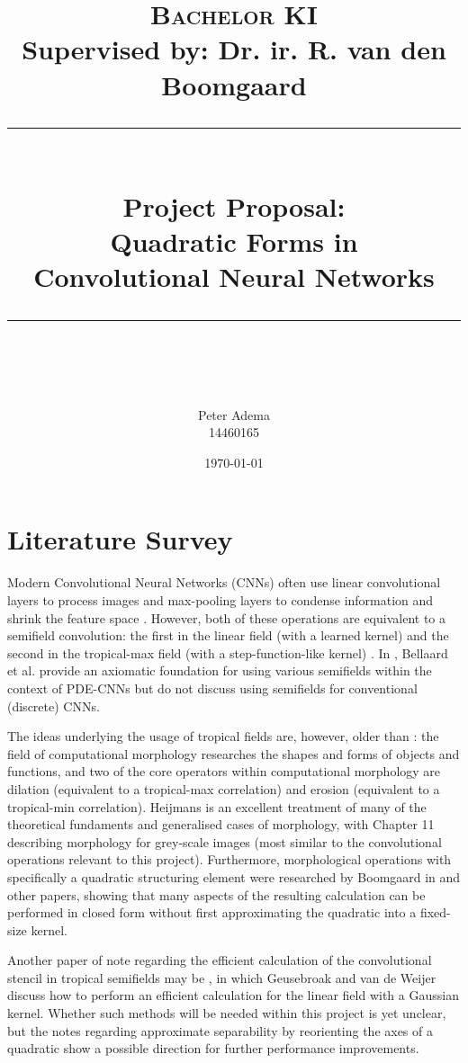 \documentclass[11pt]{article} %
\title{	
    \vspace*{-1.5cm}
	\normalfont\normalsize
	\textsc{Bachelor KI}\\ Supervised by: Dr. ir. R. van den Boomgaard\\ %
	\vspace{3pt}
	\rule{\linewidth}{0.5pt}\\
	{\huge Project Proposal:\\Quadratic Forms in\\ Convolutional Neural Networks}\\ %
	\vspace{4pt}
	\rule{\linewidth}{2pt}\\
	\vspace{4pt}
}
\author{
    \Large Peter Adema \\ 14460165
}
\date{\normalsize\today}  %
\begin{document}
\maketitle %

\section{Literature Survey}
Modern Convolutional Neural Networks (CNNs) often use linear convolutional layers to process images and max-pooling layers to condense information and shrink the feature space \cite{introconvnets}. However, both of these operations are equivalent to a semifield convolution: the first in the linear field (with a learned kernel) and the second in the tropical-max field (with a step-function-like kernel) \cite{bellaardaxiomatic}. In \cite{bellaardaxiomatic}, Bellaard et al. provide an axiomatic foundation for using various semifields within the context of PDE-CNNs but do not discuss using semifields for conventional (discrete) CNNs. 

The ideas underlying the usage of tropical fields are, however, older than \cite{bellaardaxiomatic}: the field of computational morphology researches the shapes and forms of objects and functions, and two of the core operators within computational morphology are dilation (equivalent to a tropical-max correlation) and erosion (equivalent to a tropical-min correlation). Heijmans \cite{heijmans1996morphological} is an excellent treatment of many of the theoretical fundaments and generalised cases of morphology, with Chapter 11 describing morphology for grey-scale images (most similar to the convolutional operations relevant to this project). Furthermore, morphological operations with specifically a quadratic structuring element were researched by Boomgaard in \cite{Boomgaard1999NumericalSS} and other papers, showing that many aspects of the resulting calculation can be performed in closed form without first approximating the quadratic into a fixed-size kernel.

Another paper of note regarding the efficient calculation of the convolutional stencil in tropical semifields may be \cite{fastanifilter}, in which Geusebroak and van de Weijer discuss how to perform an efficient calculation for the linear field with a Gaussian kernel. Whether such methods will be needed within this project is yet unclear, but the notes regarding approximate separability by reorienting the axes of a quadratic show a possible direction for further performance improvements.
\end{document}
